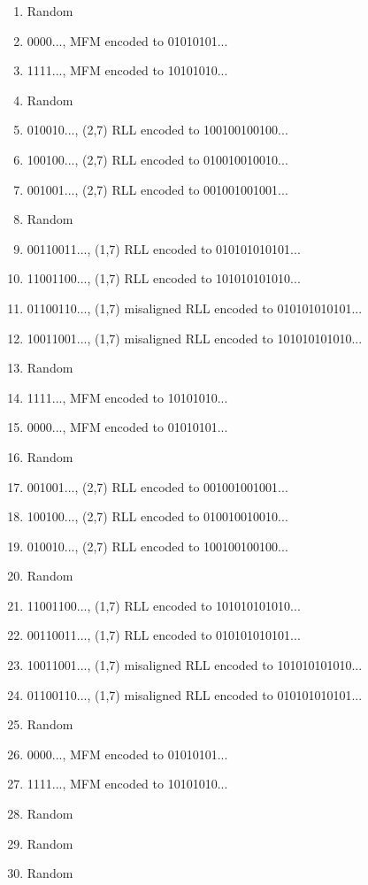 \begin{enumerate}
   \item  Random
   \item  0000..., MFM encoded to 01010101...
   \item  1111..., MFM encoded to 10101010...
   \item  Random
   \item  010010..., (2,7) RLL encoded to 100100100100...
   \item  100100..., (2,7) RLL encoded to 010010010010...
   \item  001001..., (2,7) RLL encoded to 001001001001...
   \item  Random
   \item  00110011..., (1,7) RLL encoded to 010101010101...
  \item  11001100..., (1,7) RLL encoded to 101010101010...
  \item  01100110..., (1,7) misaligned RLL encoded to 010101010101...
  \item  10011001..., (1,7) misaligned RLL encoded to 101010101010...
  \item  Random
  \item  1111..., MFM encoded to 10101010...
  \item  0000..., MFM encoded to 01010101...
  \item  Random
  \item  001001..., (2,7) RLL encoded to 001001001001...
  \item  100100..., (2,7) RLL encoded to 010010010010...
  \item  010010..., (2,7) RLL encoded to 100100100100...
  \item  Random
  \item  11001100..., (1,7) RLL encoded to 101010101010...
  \item  00110011..., (1,7) RLL encoded to 010101010101...
  \item  10011001..., (1,7) misaligned RLL encoded to 101010101010...
  \item  01100110..., (1,7) misaligned RLL encoded to 010101010101...
  \item  Random
  \item  0000..., MFM encoded to 01010101...
  \item  1111..., MFM encoded to 10101010...
  \item  Random
  \item  Random
  \item  Random
\end{enumerate}

